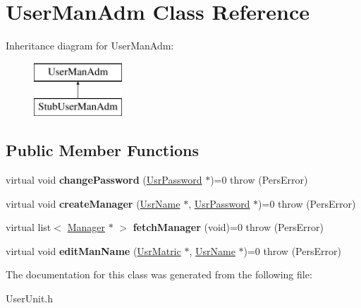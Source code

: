 \hypertarget{classUserManAdm}{\section{User\-Man\-Adm Class Reference}
\label{da/d86/classUserManAdm}
}
Inheritance diagram for User\-Man\-Adm\-:\begin{figure}[H]
\begin{center}
\leavevmode
\includegraphics[height=2.000000cm]{da/d86/classUserManAdm}
\end{center}
\end{figure}
\subsection*{Public Member Functions}
\begin{DoxyCompactItemize}
\item 
\hypertarget{classUserManAdm_a75006ea396a6384bbf47918fe9316bce}{virtual void {\bfseries change\-Password} (\hyperlink{classUsrPassword}{Usr\-Password} $\ast$)=0  throw (\-Pers\-Error)}\label{da/d86/classUserManAdm_a75006ea396a6384bbf47918fe9316bce}

\item 
\hypertarget{classUserManAdm_a4c1d61e8190867eb786cdf97083ba289}{virtual void {\bfseries create\-Manager} (\hyperlink{classUsrName}{Usr\-Name} $\ast$, \hyperlink{classUsrPassword}{Usr\-Password} $\ast$)=0  throw (\-Pers\-Error)}\label{da/d86/classUserManAdm_a4c1d61e8190867eb786cdf97083ba289}

\item 
\hypertarget{classUserManAdm_a9efb85ba1a3cad428e6c0b2dfb044fd8}{virtual list$<$ \hyperlink{classManager}{Manager} $\ast$ $>$ {\bfseries fetch\-Manager} (void)=0  throw (\-Pers\-Error)}\label{da/d86/classUserManAdm_a9efb85ba1a3cad428e6c0b2dfb044fd8}

\item 
\hypertarget{classUserManAdm_a0440de1c9d712a8dac1aa4e526d0fe9b}{virtual void {\bfseries edit\-Man\-Name} (\hyperlink{classUsrMatric}{Usr\-Matric} $\ast$, \hyperlink{classUsrName}{Usr\-Name} $\ast$)=0  throw (\-Pers\-Error)}\label{da/d86/classUserManAdm_a0440de1c9d712a8dac1aa4e526d0fe9b}

\end{DoxyCompactItemize}


The documentation for this class was generated from the following file\-:\begin{DoxyCompactItemize}
\item 
User\-Unit.\-h\end{DoxyCompactItemize}
